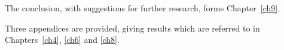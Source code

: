 \documentclass[12pt]{report}
\begin{document}
The conclusion, with suggestions for further research, forms Chapter~\ref{ch9}.

Three appendices are provided, giving results which are referred to in
Chapters~\ref{ch4}, \ref{ch6} and \ref{ch8}.

%
%
%
%
%
%
%
\makeatletter
\newcommand{\ecell}{\rule{0.5em}{0pt}}
\newlength{\lsq@cell}
\iflatexml
  \newenvironment{latinsq}[2][0]{%
    \settowidth{\lsq@cell}{#1}%
    \advance\lsq@cell by 1.1em
    \ifdim\lsq@cell<1.8em \lsq@cell 1.8em\fi
    \def\lsq@strut{\rule[-0.3\lsq@cell]{0pt}{\lsq@cell}}%
    \begin{tabular}{|*{#2}{>{\lsq@strut}c|}}%
  }{\end{tabular}}
\end{document}
